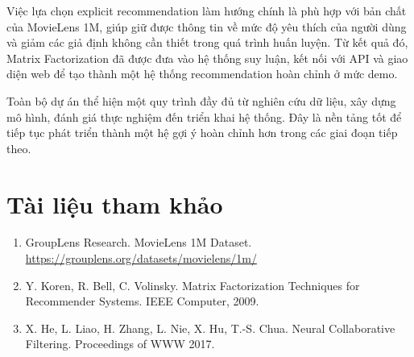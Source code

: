 \documentclass[12pt,a4paper]{article}
\begin{document}
Việc lựa chọn explicit recommendation làm hướng chính là phù hợp với bản chất của MovieLens 1M, giúp giữ được thông tin về mức độ yêu thích của người dùng và giảm các giả định không cần thiết trong quá trình huấn luyện. Từ kết quả đó, Matrix Factorization đã được đưa vào hệ thống suy luận, kết nối với API và giao diện web để tạo thành một hệ thống recommendation hoàn chỉnh ở mức demo.

Toàn bộ dự án thể hiện một quy trình đầy đủ từ nghiên cứu dữ liệu, xây dựng mô hình, đánh giá thực nghiệm đến triển khai hệ thống. Đây là nền tảng tốt để tiếp tục phát triển thành một hệ gợi ý hoàn chỉnh hơn trong các giai đoạn tiếp theo.

\section*{Tài liệu tham khảo}

\begin{enumerate}[leftmargin=1.2cm]
    \item GroupLens Research. MovieLens 1M Dataset. \url{https://grouplens.org/datasets/movielens/1m/}
    \item Y. Koren, R. Bell, C. Volinsky. Matrix Factorization Techniques for Recommender Systems. IEEE Computer, 2009.
    \item X. He, L. Liao, H. Zhang, L. Nie, X. Hu, T.-S. Chua. Neural Collaborative Filtering. Proceedings of WWW 2017.
\end{enumerate}
\end{document}
